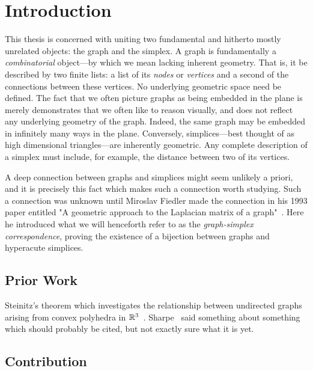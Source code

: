 \chapter{Introduction}
\label{chap:intro}

This thesis is concerned with uniting two fundamental and hitherto mostly unrelated objects: the graph and the simplex. A graph is fundamentally a  \emph{combinatorial} object---by which we mean lacking inherent geometry. That is, it be described by two finite lists: a list of its \emph{nodes} or \emph{vertices} and a second of the connections between these vertices. No underlying geometric space need be defined. 
The fact that we often picture graphs as being embedded in the plane is merely demonstrates that we often like to reason visually, and does not reflect any underlying geometry of the graph. Indeed, the same graph may be embedded in infinitely many ways in the plane.  
Conversely, simplices---best thought of as high dimensional triangles---are inherently geometric.  Any complete description of a simplex must include, for  example, the distance between two of its vertices. 

A deep connection between graphs and simplices might seem unlikely a priori, and  it is precisely this fact which makes such a connection worth studying. Such a connection was unknown until Miroslav Fiedler made the connection in his 1993 paper entitled "A geometric approach to the Laplacian matrix of a graph"~\cite{fiedler1993geometric}. Here he introduced what we will henceforth refer to as the \emph{graph-simplex correspondence}, proving the existence  of a bijection between graphs and hyperacute simplices. 



\section{Prior Work}
\label{chap:intro_prior_work}

Steinitz's theorem which investigates the relationship between undirected graphs arising from convex polyhedra in $\mathbb{R}^3$~\cite{steinitz1922polyeder}. 
Sharpe~\cite{sharpe1967theorem} said something about something which should probably be cited, but not exactly sure what it is yet. 


\section{Contribution}
\label{chap:intro_contribution}

